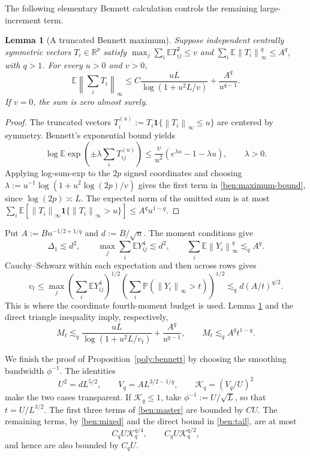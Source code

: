 \documentclass[11pt,letterpaper]{article}
\newtheorem{lemma}{Lemma}
\theoremstyle{remark}
\newcommand{\E}{\mathbb E}
\newcommand{\Pp}{\mathbb P}
\newcommand{\R}{\mathbb R}
\newcommand{\norm}[1]{\left\lVert#1\right\rVert}
\newcommand{\ind}{\mathbf 1}
\begin{document}
The following elementary Bennett calculation controls the remaining
large-increment term.

\begin{lemma}[A truncated Bennett maximum]\label{ben:maximum}
Suppose independent centrally symmetric vectors \(T_i\in\R^p\)
satisfy \(\max_j\sum_i\E T_{ij}^2\le v\) and
\(\sum_i\E\norm{T_i}_\infty^q\le A^q\), with \(q>1\).
For every \(u>0\) and \(v>0\),
\begin{equation}
 \E\norm{\sum_iT_i}_\infty
 \le C\frac{uL}{\log(1+u^2L/v)}+\frac{A^q}{u^{q-1}}.
 \label{ben:maximum-bound}
\end{equation}
If \(v=0\), the sum is zero almost surely.
\end{lemma}
\begin{proof}
The truncated vectors \(T_i^{(u)}:=T_i\ind\{\norm{T_i}_\infty\le u\}\)
are centered by symmetry. Bennett's exponential bound yields
\[
 \log\E\exp\left(\pm\lambda\sum_iT_{ij}^{(u)}\right)
 \le\frac v{u^2}(e^{\lambda u}-1-\lambda u),\qquad\lambda>0.
\]
Applying log-sum-exp to the \(2p\) signed coordinates and choosing
\(\lambda:=u^{-1}\log(1+u^2\log(2p)/v)\) gives the first term in
\eqref{ben:maximum-bound}, since \(\log(2p)\asymp L\).
The expected norm of the omitted sum is at most
\(\sum_i\E[\norm{T_i}_\infty\ind\{\norm{T_i}_\infty>u\}]
\le A^qu^{1-q}\).
\end{proof}

Put \(A:=Bn^{-1/2+1/q}\) and \(d:=B/\sqrt n\). The moment
conditions give
\[
 \Delta_1\lesssim d^2,\qquad
 \max_j\sum_i\E Y_{ij}^4\lesssim d^2,\qquad
 \sum_i\E\norm{Y_i}_\infty^q\lesssim_q A^q.
\]
Cauchy--Schwarz within each expectation and then across rows gives
\begin{equation}
 v_t\le
 \max_j\left(\sum_i\E Y_{ij}^4\right)^{1/2}
       \left(\sum_i\Pp(\norm{Y_i}_\infty>t)\right)^{1/2}
 \lesssim_q d(A/t)^{q/2}.
 \label{ben:mixed}
\end{equation}
This is where the coordinate fourth-moment budget is used. Lemma
\ref{ben:maximum} and the direct triangle inequality imply, respectively,
\begin{equation}
 M_t\lesssim_q\frac{uL}{\log(1+u^2L/v_t)}+\frac{A^q}{u^{q-1}},
 \qquad M_t\lesssim_q A^qt^{1-q}.
 \label{ben:tail}
\end{equation}

We finish the proof of Proposition~\ref{poly:bennett} by choosing the
smoothing bandwidth \(\phi^{-1}\). The identities
\[
 U^2=dL^{5/2},\qquad V_q=AL^{3/2-1/q},\qquad
 \mathcal K_q=(V_q/U)^2
\]
make the two cases transparent. If \(\mathcal K_q\le1\), take
\(\phi^{-1}:=U/\sqrt L\), so that \(t=U/L^{3/2}\).
The first three terms of \eqref{ben:master} are bounded by \(CU\).
The remaining terms, by \eqref{ben:mixed} and the direct bound in
\eqref{ben:tail}, are at most
\[
 C_qU \mathcal K_q^{q/4},\qquad C_qU \mathcal K_q^{q/2},
\]
and hence are also bounded by \(C_qU\).
\end{document}
